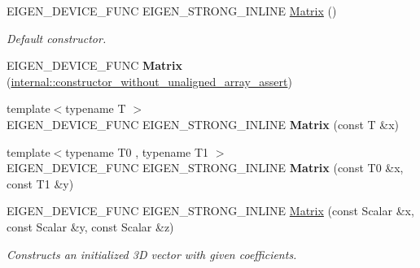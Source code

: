 \begin{DoxyCompactItemize}
\item 
E\+I\+G\+E\+N\+\_\+\+D\+E\+V\+I\+C\+E\+\_\+\+F\+U\+NC E\+I\+G\+E\+N\+\_\+\+S\+T\+R\+O\+N\+G\+\_\+\+I\+N\+L\+I\+NE \mbox{\hyperlink{class_eigen_1_1_matrix_a11f852d66fa55b2aed12aa22da807a6b}{Matrix}} ()
\begin{DoxyCompactList}\small\item\em Default constructor. \end{DoxyCompactList}\item 
\mbox{\label{class_eigen_1_1_matrix_a5bbd7c7b21472f8e9aa466a5080f97b9}} 
E\+I\+G\+E\+N\+\_\+\+D\+E\+V\+I\+C\+E\+\_\+\+F\+U\+NC {\bfseries Matrix} (\mbox{\hyperlink{struct_eigen_1_1internal_1_1constructor__without__unaligned__array__assert}{internal\+::constructor\+\_\+without\+\_\+unaligned\+\_\+array\+\_\+assert}})
\item 
\mbox{\label{class_eigen_1_1_matrix_a077d67b4a547352955d4173d223c192d}} 
{\footnotesize template$<$typename T $>$ }\\E\+I\+G\+E\+N\+\_\+\+D\+E\+V\+I\+C\+E\+\_\+\+F\+U\+NC E\+I\+G\+E\+N\+\_\+\+S\+T\+R\+O\+N\+G\+\_\+\+I\+N\+L\+I\+NE {\bfseries Matrix} (const T \&x)
\item 
\mbox{\label{class_eigen_1_1_matrix_a729679e1e703fe898561ba64c07293d1}} 
{\footnotesize template$<$typename T0 , typename T1 $>$ }\\E\+I\+G\+E\+N\+\_\+\+D\+E\+V\+I\+C\+E\+\_\+\+F\+U\+NC E\+I\+G\+E\+N\+\_\+\+S\+T\+R\+O\+N\+G\+\_\+\+I\+N\+L\+I\+NE {\bfseries Matrix} (const T0 \&x, const T1 \&y)
\item 
\mbox{\label{class_eigen_1_1_matrix_a0a422e4c801e859d47226c348c482cb5}} 
E\+I\+G\+E\+N\+\_\+\+D\+E\+V\+I\+C\+E\+\_\+\+F\+U\+NC E\+I\+G\+E\+N\+\_\+\+S\+T\+R\+O\+N\+G\+\_\+\+I\+N\+L\+I\+NE \mbox{\hyperlink{class_eigen_1_1_matrix_a0a422e4c801e859d47226c348c482cb5}{Matrix}} (const Scalar \&x, const Scalar \&y, const Scalar \&z)
\begin{DoxyCompactList}\small\item\em Constructs an initialized 3D vector with given coefficients. \end{DoxyCompactList}\item 
\mbox{\label{class_eigen_1_1_matrix_afe8c7913883c78db58f15e22103f93a2}} 

\end{DoxyCompactItemize}

